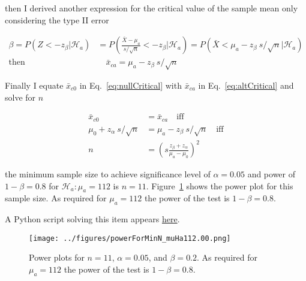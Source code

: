 \documentclass[12pt]{article}
\begin{document}
\begin{enumerate}
\begin{enumerate}
                then I derived another expression for the critical value of the
                sample mean only considering the type II error

                \begin{align}
                    \beta=P(Z<-z_\beta|\mathcal{H}_a)&=P(\frac{\bar{X}-\mu_a}{s/\sqrt{n}}<-z_\beta|\mathcal{H}_a)=P(\bar{X}<\mu_a-z_\beta\
                    s/\sqrt{n}|\mathcal{H}_a)\nonumber\\
                    \text{then}&\quad\bar{x}_{ca}=\mu_a-z_\beta\ s/\sqrt{n}\label{eq:altCritical}
                \end{align}

                Finally I equate $\bar{x}_{c0}$ in Eq.~\ref{eq:nullCritical}
                with $\bar{x}_{ca}$ in Eq.~\ref{eq:altCritical} and solve for
                $n$

                \begin{align*}
                    \bar{x}_{c0}&=\bar{x}_{ca}\quad\text{iff}\\
                    \mu_0+z_\alpha\ s/\sqrt{n}&=\mu_a-z_\beta\ s/\sqrt{n}\quad\text{iff}\\
                    n&=\left(s\frac{z_\beta+z_\alpha}{\mu_a-\mu_0}\right)^2
                \end{align*}

                the minimum sample size to achieve significance level of
                $\alpha=0.05$ and power of $1-\beta=0.8$ for $\mathcal{H}_a:
                \mu_a=112$ is $n=11$. Figure~\ref{fig:powerPlotForMinN} shows
                the power plot for this sample size. As required for
                $\mu_a=112$ the power of the test is $1-\beta=0.8$.

                A Python script solving this item appears
                \href{https://github.com/joacorapela/neuroinformatics24/blob/master/worksheets/01_tTestAndRandomizationTests/mySolution/code/doPowerExd.py}{here}.

                \begin{figure}
                    \begin{center}
                        \texttt{[image: ../figures/powerForMinN\_muHa112.00.png]}
                    \end{center}
                    \caption{Power plots for $n=11$, $\alpha=0.05$, and
                    $\beta=0.2$. As required for $\mu_a=112$ the power of the
                    test is $1-\beta=0.8$.}
                    \label{fig:powerPlotForMinN}
                \end{figure}


        \end{enumerate}
\end{enumerate}
\end{document}
